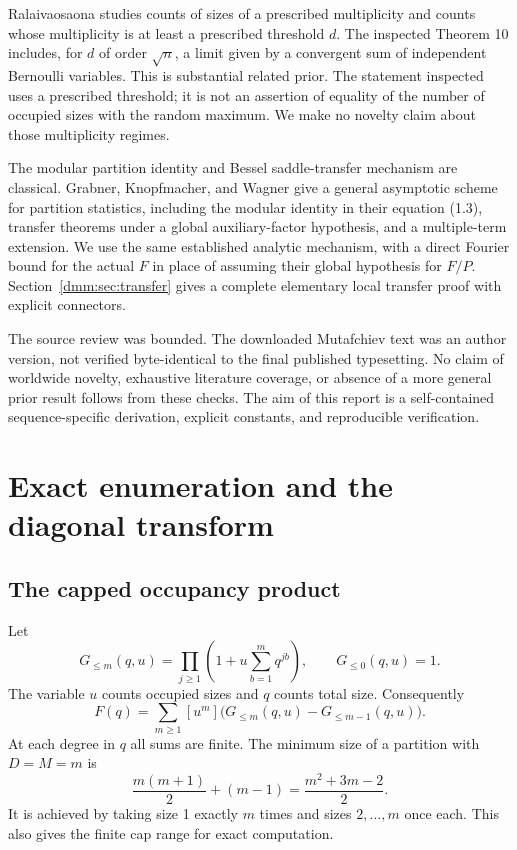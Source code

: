 \documentclass[11pt,letterpaper]{article}
\numberwithin{equation}{section}
\theoremstyle{definition}\newtheorem{definition}[theorem]{Definition}
\theoremstyle{remark}\newtheorem{remark}[theorem]{Remark}
\begin{document}
Ralaivaosaona \cite{rala} studies counts of sizes of a prescribed multiplicity and counts whose multiplicity is at least a prescribed threshold $d$. The inspected Theorem 10 includes, for $d$ of order $\sqrt n$, a limit given by a convergent sum of independent Bernoulli variables. This is substantial related prior. The statement inspected uses a prescribed threshold; it is not an assertion of equality of the number of occupied sizes with the random maximum. We make no novelty claim about those multiplicity regimes.

The modular partition identity and Bessel saddle-transfer mechanism are classical. Grabner, Knopfmacher, and Wagner \cite{grabner} give a general asymptotic scheme for partition statistics, including the modular identity in their equation (1.3), transfer theorems under a global auxiliary-factor hypothesis, and a multiple-term extension. We use the same established analytic mechanism, with a direct Fourier bound for the actual $F$ in place of assuming their global hypothesis for $F/P$. Section~\ref{dmm:sec:transfer} gives a complete elementary local transfer proof with explicit connectors.

The source review was bounded. The downloaded Mutafchiev text was an author version, not verified byte-identical to the final published typesetting. No claim of worldwide novelty, exhaustive literature coverage, or absence of a more general prior result follows from these checks. The aim of this report is a self-contained sequence-specific derivation, explicit constants, and reproducible verification.

\section{Exact enumeration and the diagonal transform}\label{dmm:sec:exact}
\subsection{The capped occupancy product}
Let
\begin{equation}\label{dmm:eq:capGF}
G_{\le m}(q,u)=\prod_{j\ge1}\left(1+u\sum_{b=1}^{m}q^{jb}\right),
\qquad G_{\le0}(q,u)=1.
\end{equation}
The variable $u$ counts occupied sizes and $q$ counts total size. Consequently
\begin{equation}\label{dmm:eq:diagonalcap}
F(q)=\sum_{m\ge1}[u^m]\bigl(G_{\le m}(q,u)-G_{\le m-1}(q,u)\bigr).
\end{equation}
At each degree in $q$ all sums are finite. The minimum size of a partition with $D=M=m$ is
\begin{equation}\label{dmm:eq:minweight}
\frac{m(m+1)}2+(m-1)=\frac{m^2+3m-2}{2}.
\end{equation}
It is achieved by taking size 1 exactly $m$ times and sizes $2,\ldots,m$ once each. This also gives the finite cap range for exact computation.
\end{document}
